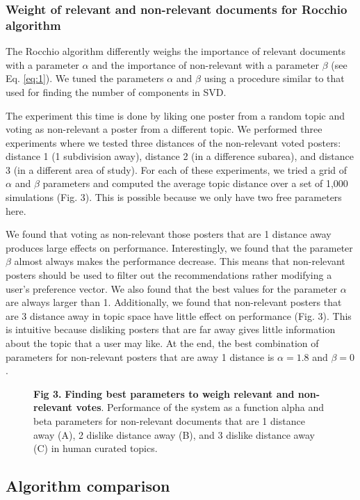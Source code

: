 \documentclass[a4paper]{article}
\begin{document}
\subsubsection*{Weight of relevant and non-relevant documents for Rocchio algorithm}

The Rocchio algorithm differently weighs the importance of relevant documents with a parameter $\alpha$ and the importance of non-relevant with a parameter $\beta$ (see  Eq. \ref{eq:1}). We tuned the parameters $\alpha$ and $\beta$ using a procedure similar to that used for finding the number of components in SVD.

The experiment this time is done by liking one poster from a random topic and voting as non-relevant a poster from a different topic. We performed three experiments where we tested three distances of the non-relevant voted posters: distance 1 (1 subdivision away), distance 2 (in a difference subarea), and distance 3 (in a different area of study). For each of these experiments, we tried a grid of $\alpha$ and $\beta$ parameters and computed the average topic distance over a set of 1,000 simulations (Fig. 3). This is possible because we only have two free parameters here.

We found that voting as non-relevant those posters that are 1 distance away produces large effects on performance. Interestingly, we found that the parameter $\beta$ almost always makes the performance decrease. This means that non-relevant posters should be used to filter out the recommendations rather modifying a user’s preference vector. We also found that the best values for the parameter $\alpha$ are always larger than 1. Additionally, we found that non-relevant posters that are 3 distance away in topic space have little effect on performance (Fig. 3). This is intuitive because disliking posters that are far away gives little information about the topic that a user may like. At the end, the best combination of parameters for non-relevant posters that are away 1 distance is $\alpha=1.8$ and $\beta=0$.


\begin{figure}[!ht]
\centering
\caption*{\textbf{Fig 3.} \textbf{Finding best parameters to weigh relevant and non-relevant votes}. Performance of the system as a function alpha and beta parameters for non-relevant documents that are 1 distance away (A), 2 dislike distance away (B), and 3 dislike distance away (C) in human curated topics.}
\end{figure}

\subsection{Algorithm comparison}
\end{document}
